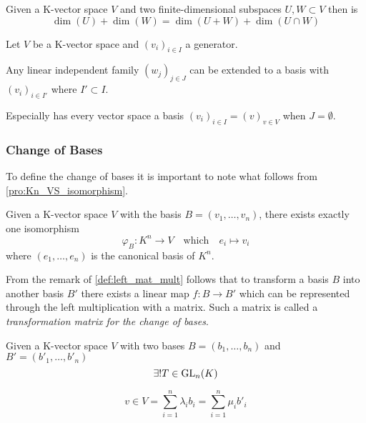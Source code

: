\begin{corollary}
   Given a K-vector space \(V\) and two finite-dimensional subspaces \(U, W \subset V\) then is
   \[\dim(U) + \dim(W) = \dim(U+W) + \dim(U \cap W)\]
\end{corollary}

\begin{proposition}
   Let \(V\) be a K-vector space and \((v_i)_{i \in I}\) a generator.

   Any linear independent family \((w_j)_{j \in J}\) can be extended to a basis with \((v_i)_{i \in I'}\) where \(I' \subset I\).
\end{proposition}
\begin{remark}
   Especially has every vector space a basis \((v_i)_{i \in I} = (v)_{v \in V}\) when \(J = \emptyset\).
\end{remark}

\subsubsection{Change of Bases}
To define the change of bases it is important to note what follows from \cref{pro:Kn_VS_isomorphism}.
\begin{remark}
   Given a K-vector space \(V\) with the basis \(B = (v_1, \ldots, v_n)\), there exists exactly one isomorphism
   \[\varphi_{B}: K^n \to V \quad\text{which}\quad e_i \mapsto v_i\]
   where \((e_1, \ldots, e_n)\) is the canonical basis of \(K^n\).
\end{remark}

From the remark of \cref{def:left_mat_mult} follows that to transform a basis \(B\) into another basis \(B'\) there exists a linear map \(f: B \to B'\) which can be represented through the left multiplication with a matrix.
Such a matrix is called a \emph{transformation matrix for the change of bases}.

\begin{definition}\label{def:bases_transmat}
   Given a K-vector space \(V\) with two bases \(B = (b_1, \ldots, b_n)\) and \(B' = (b'_1, \ldots, b'_n)\)
   \[\exists! T \in \operatorname{GL}_n(K)\]

   \begin{center}
   \end{center}
   \[v \in V = \sum_{i=1}^n \lambda_i b_i = \sum_{i=1}^n \mu_i b'_i\]
\end{definition}

